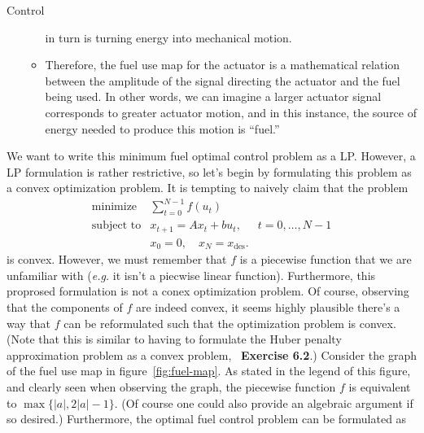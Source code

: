 \begin{chapter}{Control}
\begin{itemize}
\begin{itemize}
                    in turn is turning energy into mechanical motion.
                    \item Therefore, the fuel use map for the actuator is a mathematical
                    relation between the amplitude of the signal directing the actuator and
                    the fuel being used. In other words, we can imagine a larger actuator
                    signal corresponds to greater actuator motion, and in this instance,
                    the source of energy needed to produce this motion is ``fuel.''
                \end{itemize}
        \end{itemize}
     We want to write this minimum
     fuel optimal control problem as a LP. However, a LP formulation is rather restrictive,
     so let's begin by formulating this problem as a convex optimization problem. It is tempting
     to naively claim that the problem
    \[\begin{array}{lll}
    \text{minimize} \; & \sum_{t=0}^{N-1} f(u_t) & \\
    \text{subject to} & x_{t+1} = Ax_t + bu_t, \; & t=0, \ldots, N-1 \\
    & x_0 = 0, \quad x_{N} = x_{\text{des}}.
    \end{array}\]
    is convex. However, we must remember that $f$ is a piecewise function that we are unfamiliar with (\textit{e.g.}
    it isn't a piecwise linear function). Furthermore, this proprosed formulation is not a conex optimization
    problem. Of course, observing that the components of $f$ are indeed convex, it seems highly
    plausible there's a way that $f$ can be reformulated such that the optimization problem is convex.
    (Note that this is similar to having to formulate the Huber penalty approximation problem
    as a convex problem,~\cite{boyd_convex_optimization} \textbf{Exercise 6.2}.)
    Consider the graph of the fuel use map in figure~\ref{fig:fuel-map}. As stated in the legend of this figure,
    and clearly seen when observing the graph,
    the piecewise function $f$ is equivalent to $\max\{\left| a \right|, 2 \left| a \right| - 1\}$.
    (Of course one could also provide an algebraic argument if so desired.) Furthermore, 
    the optimal fuel control problem can be formulated as


\end{chapter}
